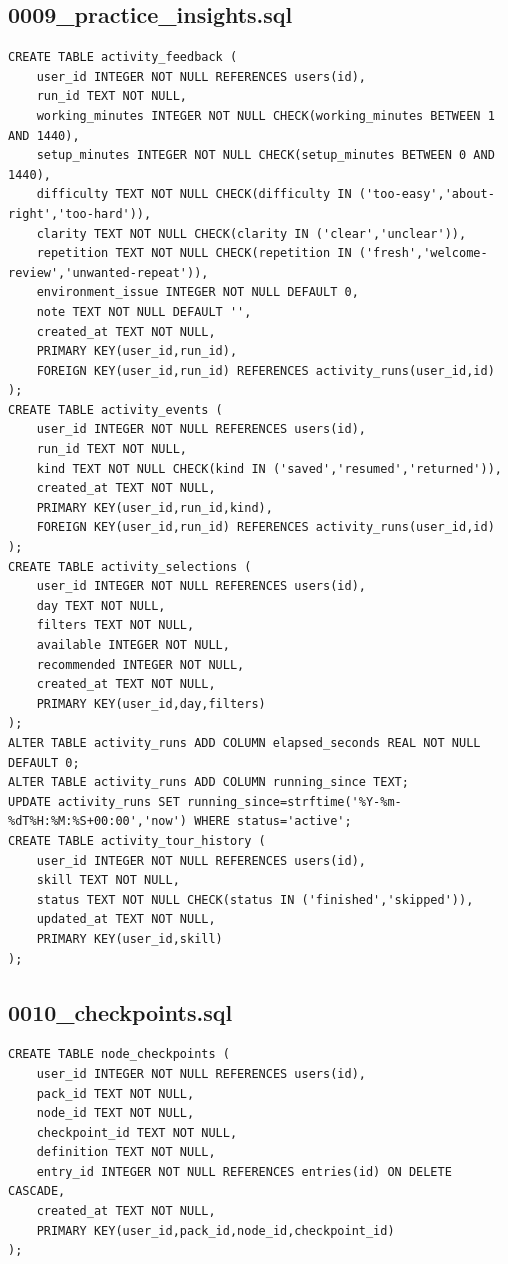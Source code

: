 \subsection{0009\_practice\_insights.sql}
\begin{verbatim}
CREATE TABLE activity_feedback (
    user_id INTEGER NOT NULL REFERENCES users(id),
    run_id TEXT NOT NULL,
    working_minutes INTEGER NOT NULL CHECK(working_minutes BETWEEN 1 AND 1440),
    setup_minutes INTEGER NOT NULL CHECK(setup_minutes BETWEEN 0 AND 1440),
    difficulty TEXT NOT NULL CHECK(difficulty IN ('too-easy','about-right','too-hard')),
    clarity TEXT NOT NULL CHECK(clarity IN ('clear','unclear')),
    repetition TEXT NOT NULL CHECK(repetition IN ('fresh','welcome-review','unwanted-repeat')),
    environment_issue INTEGER NOT NULL DEFAULT 0,
    note TEXT NOT NULL DEFAULT '',
    created_at TEXT NOT NULL,
    PRIMARY KEY(user_id,run_id),
    FOREIGN KEY(user_id,run_id) REFERENCES activity_runs(user_id,id)
);
CREATE TABLE activity_events (
    user_id INTEGER NOT NULL REFERENCES users(id),
    run_id TEXT NOT NULL,
    kind TEXT NOT NULL CHECK(kind IN ('saved','resumed','returned')),
    created_at TEXT NOT NULL,
    PRIMARY KEY(user_id,run_id,kind),
    FOREIGN KEY(user_id,run_id) REFERENCES activity_runs(user_id,id)
);
CREATE TABLE activity_selections (
    user_id INTEGER NOT NULL REFERENCES users(id),
    day TEXT NOT NULL,
    filters TEXT NOT NULL,
    available INTEGER NOT NULL,
    recommended INTEGER NOT NULL,
    created_at TEXT NOT NULL,
    PRIMARY KEY(user_id,day,filters)
);
ALTER TABLE activity_runs ADD COLUMN elapsed_seconds REAL NOT NULL DEFAULT 0;
ALTER TABLE activity_runs ADD COLUMN running_since TEXT;
UPDATE activity_runs SET running_since=strftime('%Y-%m-%dT%H:%M:%S+00:00','now') WHERE status='active';
CREATE TABLE activity_tour_history (
    user_id INTEGER NOT NULL REFERENCES users(id),
    skill TEXT NOT NULL,
    status TEXT NOT NULL CHECK(status IN ('finished','skipped')),
    updated_at TEXT NOT NULL,
    PRIMARY KEY(user_id,skill)
);
\end{verbatim}
\subsection{0010\_checkpoints.sql}
\begin{verbatim}
CREATE TABLE node_checkpoints (
    user_id INTEGER NOT NULL REFERENCES users(id),
    pack_id TEXT NOT NULL,
    node_id TEXT NOT NULL,
    checkpoint_id TEXT NOT NULL,
    definition TEXT NOT NULL,
    entry_id INTEGER NOT NULL REFERENCES entries(id) ON DELETE CASCADE,
    created_at TEXT NOT NULL,
    PRIMARY KEY(user_id,pack_id,node_id,checkpoint_id)
);
\end{verbatim}
